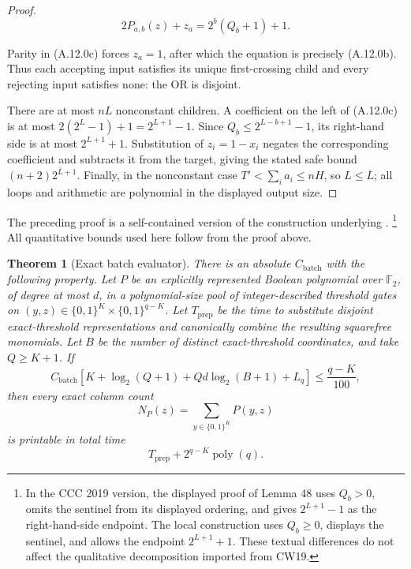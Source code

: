 \documentclass[11pt,letterpaper]{article}
\newtheorem{theorem}{Theorem}[section]
\theoremstyle{definition}
\theoremstyle{remark}
\newcommand{\Ftwo}{\mathbb F_2}
\begin{document}
\begin{proof}
\[
2P_{a,b}(z)+z_a=2^b(Q_b+1)+1.
\tag{A.12.0c}
\]

Parity in (A.12.0c) forces \(z_a=1\), after which the equation is
precisely (A.12.0b). Thus each accepting input satisfies its unique
first-crossing child and every rejecting input satisfies none: the OR is
disjoint.

There are at most \(nL\) nonconstant children. A coefficient on the left
of (A.12.0c) is at most \(2(2^L-1)+1=2^{L+1}-1\). Since
\(Q_b\le2^{L-b+1}-1\), its right-hand side is at most \(2^{L+1}+1\).
Substitution of \(z_i=1-x_i\) negates the corresponding coefficient and
subtracts it from the target, giving the stated safe bound
\((n+2)2^{\overline L+1}\). Finally, in the nonconstant case
\(T'<\sum_i a_i\le nH\), so \(L\le\overline L\); all loops and
arithmetic are polynomial in the displayed output size. \end{proof}

The preceding proof is a self-contained version of the construction
underlying \cite[Proposition 18(2) and Appendix B, Lemmas 48--49]{CW19}.%
\footnote{In the CCC 2019 version, the displayed proof of Lemma 48 uses
\(Q_b>0\), omits the sentinel from its displayed ordering, and gives
\(2^{L+1}-1\) as the right-hand-side endpoint. The local construction uses
\(Q_b\ge0\), displays the sentinel, and allows the endpoint
\(2^{L+1}+1\). These textual differences do not affect the qualitative
decomposition imported from CW19.}
All quantitative bounds used here follow from the proof above.

\begin{theorem}[Exact batch evaluator]
\label{thm:batch}
There is an absolute
\(C_{\mathrm{batch}}\) with the following property. Let \(P\) be an
explicitly represented Boolean polynomial over \(\Ftwo\), of degree at most
\(d\), in a polynomial-size pool of integer-described threshold gates on
\((y,z)\in\{0,1\}^K\times\{0,1\}^{q-K}\). Let \(T_{\mathrm{prep}}\) be
the time to substitute disjoint exact-threshold representations and
canonically combine the resulting squarefree monomials. Let \(B\) be the
number of distinct exact-threshold coordinates, and take \(Q\ge K+1\).
If \[
C_{\mathrm{batch}}\left[
K+\log_2(Q+1)
+Qd\log_2(B+1)
+L_q
\right]
\le
\frac{q-K}{100},
\] then every exact column count \[
N_P(z)=\sum_{y\in\{0,1\}^K}P(y,z)
\] is printable in total time \[
T_{\mathrm{prep}}
{}+{}
2^{q-K}\operatorname{poly}(q).
\]
\end{theorem}
\end{document}
